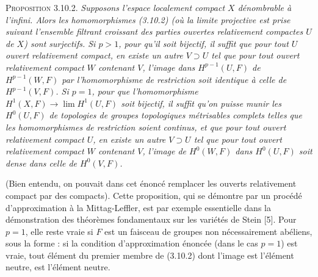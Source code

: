 \textsc{Proposition 3.10.2.} \textit{Supposons l'espace localement
compact $X$ dénombrable à l'infini. Alors les homomorphismes \textup{(3.10.2)} \textup{(}où la
limite projective est prise suivant l'ensemble filtrant croissant des parties
ouvertes relativement compactes $U$ de $X$\textup{)} sont surjectifs. Si $p>1$, pour
qu'il soit bijectif, il suffit que pour tout $U$ ouvert relativement compact,
en existe un autre $V\supset U$ tel que pour tout ouvert relativement compact
$W$ contenant $V$, l'image dans $H^{p-1}(U,F)$ de $H^{p-1}(W,F)$ par
l'homomorphisme de restriction soit identique à celle de $H^{p-1}(V,F)$. Si
$p=1$, pour que l'homomorphisme
$H^1(X,F)\to\lim H^1(U,F)$ soit bijectif, il suffit qu'on
puisse munir les $H^0(U,F)$ de topologies de groupes topologiques métrisables
complets telles que les homomorphismes de restriction soient continus, et que
pour tout ouvert relativement compact $U$, en existe un autre $V\supset U$
tel que pour tout ouvert relativement compact $W$ contenant $V$, l'image de
$H^0(W,F)$ dans $H^0(U,F)$ soit dense dans celle de $H^0(V,F)$.}

(Bien entendu, on pouvait dans cet énoncé remplacer les ouverts relativement
compact par des compacts). Cette proposition, qui se démontre par un procédé
d'approximation à la Mittag-Leffler, est par exemple essentielle dans la
démonstration des théorèmes fondamentaux sur les variétés de Stein [5]. Pour
$p=1$, elle reste vraie si $F$ est un faisceau de groupes non nécessairement
abéliens, sous la forme : si la condition d'approximation énoncée (dans le cas
$p=1$) est vraie, tout élément du premier membre de (3.10.2) dont l'image est
l'élément neutre, est l'élément neutre.

